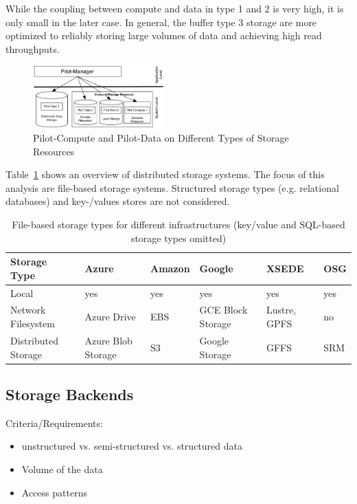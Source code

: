 \documentclass[conference]{IEEEtran}
\begin{document}
While the coupling between compute and data in type 1 and 2 is very high, it 
is only small in the later case. In general, the buffer type 3 storage are 
more optimized to reliably storing large volumes of data and achieving high
read throughputs.


\begin{figure}[t]
	\centering
		\includegraphics[width=0.45\textwidth]{figures/storage-types.pdf}
	\caption{Pilot-Compute and Pilot-Data on Different Types of Storage Resources}
	\label{fig:figures_storage-types}
\end{figure}



Table~\ref{tab:storage-systems} shows an overview of distributed storage 
systems. The focus of this analysis are file-based storage systems. Structured
storage types (e.g. relational databases) and key-/values stores are not 
considered.

\begin{table}[t]
\begin{tabular}{|p{1.3cm}|p{1cm}|p{1cm}|p{1cm}|p{1cm}|p{1cm}|}
	\hline
	\textbf{Storage Type} &\textbf{Azure} &\textbf{Amazon} &\textbf{Google} &\textbf{XSEDE}  &\textbf{OSG} \\
	\hline
	Local	&yes &yes &yes &yes &yes\\
	\hline
	Network Filesystem &Azure Drive &EBS &GCE Block Storage &Lustre, GPFS 
	&no\\
	\hline
	Distributed Storage &Azure Blob Storage &S3 &Google Storage &GFFS
	 &SRM\\
	\hline	
\end{tabular}
\caption{File-based storage types for different infrastructures (key/value and 
SQL-based storage types omitted) \label{tab:storage-systems}}
\end{table}


\subsection{Storage Backends}

Criteria/Requirements:
\begin{itemize}
	\item unstructured vs. semi-structured vs. structured data
	\item Volume of the data
	\item Access patterns
\end{itemize}
\end{document}
